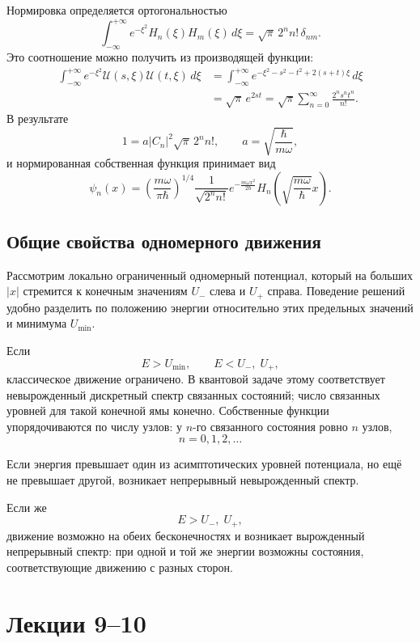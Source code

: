 \documentclass[12pt,a4paper]{article}
\begin{document}
Нормировка определяется ортогональностью
\[
    \int_{-\infty}^{+\infty}e^{-\xi^2}H_n(\xi)H_m(\xi)\,d\xi
    =\sqrt\pi\,2^n n!\,\delta_{nm}.
\]
Это соотношение можно получить из производящей функции:
\begin{align*}
    \int_{-\infty}^{+\infty}e^{-\xi^2}
    \mathcal U(s,\xi)\mathcal U(t,\xi)\,d\xi
    &=\int_{-\infty}^{+\infty}
      e^{-\xi^2-s^2-t^2+2(s+t)\xi}\,d\xi \\
    &=\sqrt\pi\,e^{2st}
    =\sqrt\pi\sum_{n=0}^{\infty}\frac{2^n s^nt^n}{n!}.
\end{align*}
В результате
\[
    1=a|C_n|^2\sqrt\pi\,2^n n!,
    \qquad a=\sqrt{\frac{\hbar}{m\omega}},
\]
и нормированная собственная функция принимает вид
\[
    \boxed{
    \psi_n(x)=
    \left(\frac{m\omega}{\pi\hbar}\right)^{1/4}
    \frac{1}{\sqrt{2^n n!}}
    e^{-\frac{m\omega x^2}{2\hbar}}
    H_n\!\left(\sqrt{\frac{m\omega}{\hbar}}x\right)}.
\]

\subsection{Общие свойства одномерного движения}

Рассмотрим локально ограниченный одномерный потенциал, который на больших
$|x|$ стремится к конечным значениям $U_-$ слева и $U_+$ справа. Поведение
решений удобно разделить по положению энергии относительно этих предельных
значений и минимума $U_{\min}$.

Если
\[
    E>U_{\min},
    \qquad
    E<U_-,\;U_+,
\]
классическое движение ограничено. В квантовой задаче этому соответствует
невырожденный дискретный спектр связанных состояний; число связанных
уровней для такой конечной ямы конечно. Собственные функции упорядочиваются
по числу узлов: у $n$-го связанного состояния ровно $n$ узлов,
\[
    n=0,1,2,\ldots
\]

Если энергия превышает один из асимптотических уровней потенциала, но ещё
не превышает другой, возникает непрерывный невырожденный спектр.

Если же
\[
    E>U_-,\;U_+,
\]
движение возможно на обеих бесконечностях и возникает вырожденный
непрерывный спектр: при одной и той же энергии возможны состояния,
соответствующие движению с разных сторон.

\section{Лекции 9--10}
\end{document}
